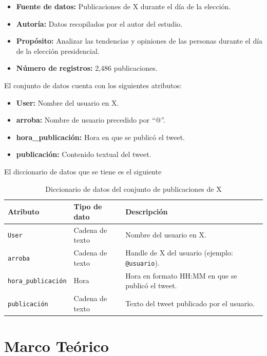 \documentclass[10pt, a4paper]{article}
\begin{document}
	\begin{itemize}
		\item \textbf{Fuente de datos:} Publicaciones de X durante el día de la elección.
		\item \textbf{Autoría:} Datos recopilados por el autor del estudio.
		\item \textbf{Propósito:} Analizar las tendencias y opiniones de las personas durante el día de la elección presidencial.
		\item \textbf{Número de registros:} 2,486 publicaciones.
	\end{itemize}
	
	El conjunto de datos cuenta con los siguientes atributos:
	
	\begin{itemize}
		\item \textbf{User:} Nombre del usuario en X.
		\item \textbf{arroba:} Nombre de usuario precedido por ``@''.
		\item \textbf{hora\_publicación:} Hora en que se publicó el tweet.
		\item \textbf{publicación:} Contenido textual del tweet.
	\end{itemize}
	
	El diccionario de datos que se tiene es el siguiente
	
	\begin{table}[h]
		\centering
		\begin{tabular}{llp{9cm}}
			\hline
			\textbf{Atributo} & \textbf{Tipo de dato} & \textbf{Descripción} \\
			\hline
			\texttt{User} & Cadena de texto & Nombre del usuario en X. \\
			\texttt{arroba} & Cadena de texto & Handle de X del usuario (ejemplo: \texttt{@usuario}). \\
			\texttt{hora\_publicación} & Hora & Hora en formato HH:MM en que se publicó el tweet. \\
			\texttt{publicación} & Cadena de texto & Texto del tweet publicado por el usuario. \\
			\hline
		\end{tabular}
		\caption{Diccionario de datos del conjunto de publicaciones de X}
	\end{table}  
	
	
	\section{Marco Teórico}
	
\end{document}

